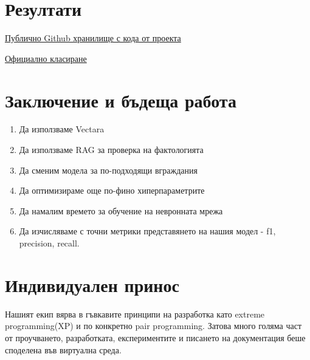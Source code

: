 \documentclass[12pt]{article}
\begin{document}
	\section{Резултати}
	
	\href{https://github.com/Kr1s1m/SemEval-2025_Task-3/}{Публично Github хранилище с кода от проекта}
	
	\linebreak 
	\href{https://mushroomeval.pythonanywhere.com/submission/}{Официално класиране}
	
	\section{Заключение и бъдеща работа}
	
	\begin{enumerate}    
		\item[\textbullet] Да използваме Vectara  
		\item[\textbullet] Да използваме RAG за проверка на фактологията
		\item[\textbullet] Да сменим модела за по-подходящи вграждания
		\item[\textbullet] Да оптимизираме още по-фино хиперпараметрите
		\item[\textbullet] Да намалим времето за обучение на невронната мрежа
		\item[\textbullet] Да изчисляваме с точни метрики представянето на нашия модел - f1, precision, recall.

	\end{enumerate}

	\section{Индивидуален принос}
	
	Нашият екип вярва в гъвкавите принципи на разработка като  extreme programming(XP) и по конкретно pair programming. Затова много голяма част от проучването, разработката, експериментите и писането на документация беше споделена във виртуална среда.  
	
\end{document}
